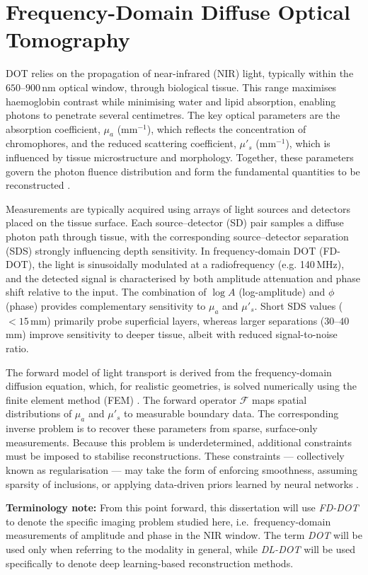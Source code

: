 \section{Frequency-Domain Diffuse Optical Tomography}
DOT relies on the propagation of near-infrared (NIR) light, typically within the $650$–$900$\,nm optical window, through biological tissue. This range maximises haemoglobin contrast while minimising water and lipid absorption, enabling photons to penetrate several centimetres. The key optical parameters are the absorption coefficient, $\mu_a$ (mm$^{-1}$), which reflects the concentration of chromophores, and the reduced scattering coefficient, $\mu'_s$ (mm$^{-1}$), which is influenced by tissue microstructure and morphology. Together, these parameters govern the photon fluence distribution and form the fundamental quantities to be reconstructed \cite{arridge1999, gibson2005}.

Measurements are typically acquired using arrays of light sources and detectors placed on the tissue surface. Each source–detector (SD) pair samples a diffuse photon path through tissue, with the corresponding source–detector separation (SDS) strongly influencing depth sensitivity. In frequency-domain DOT (FD-DOT), the light is sinusoidally modulated at a radiofrequency (e.g. 140\,MHz), and the detected signal is characterised by both amplitude attenuation and phase shift relative to the input. The combination of $\log A$ (log-amplitude) and $\phi$ (phase) provides complementary sensitivity to $\mu_a$ and $\mu'_s$. Short SDS values ($<15$\,mm) primarily probe superficial layers, whereas larger separations ($30$–$40$\,mm) improve sensitivity to deeper tissue, albeit with reduced signal-to-noise ratio.

The forward model of light transport is derived from the frequency-domain diffusion equation, which, for realistic geometries, is solved numerically using the finite element method (FEM) \cite{dehghani2009}. The forward operator $\mathcal{F}$ maps spatial distributions of $\mu_a$ and $\mu'_s$ to measurable boundary data. The corresponding inverse problem is to recover these parameters from sparse, surface-only measurements. Because this problem is underdetermined, additional constraints must be imposed to stabilise reconstructions. These constraints — collectively known as regularisation — may take the form of enforcing smoothness, assuming sparsity of inclusions, or applying data-driven priors learned by neural networks \cite{arridge1999}.

\textbf{Terminology note:} From this point forward, this dissertation will use \emph{FD-DOT} to denote the specific imaging problem studied here, i.e.\ frequency-domain measurements of amplitude and phase in the NIR window. The term \emph{DOT} will be used only when referring to the modality in general, while \emph{DL-DOT} will be used specifically to denote deep learning-based reconstruction methods.


